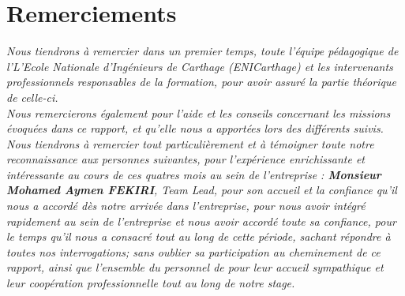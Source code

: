 \chapter*{\huge Remerciements}

\begin{center}
\it \Large
Nous tiendrons à remercier dans un premier temps, toute l’équipe pédagogique de
l’L'Ecole Nationale d'Ingénieurs de Carthage (ENICarthage) et les intervenants professionnels responsables de la formation, pour avoir assuré la partie théorique de celle-ci.\\
Nous remercierons également\textbf{ \@academicFramerName } pour l’aide et les conseils concernant les missions évoquées dans ce rapport, et qu’elle nous a apportées lors des différents suivis.\\
Nous tiendrons à remercier tout particulièrement et à témoigner toute notre reconnaissance aux personnes suivantes, pour l’expérience enrichissante et intéressante au cours de ces quatres mois au sein de l’entreprise \@companyName : \textbf{Monsieur Mohamed Aymen FEKIRI}, \textit{Team Lead}, pour son accueil et la confiance qu’il nous a accordé dès notre arrivée dans l’entreprise, pour nous avoir intégré rapidement au sein de l’entreprise et nous avoir accordé toute sa confiance, pour le temps qu’il nous a consacré tout au long de cette période, sachant répondre à toutes nos interrogations; sans oublier sa participation au cheminement de ce rapport, ainsi que l’ensemble du personnel de \@companyName pour leur accueil sympathique et leur coopération professionnelle tout au long de notre stage.


    
\end{center}
